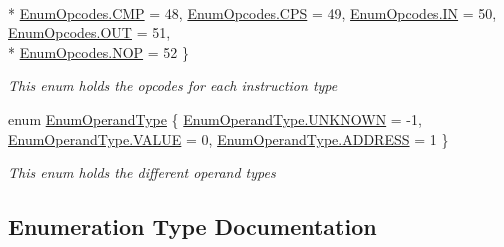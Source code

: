 \begin{DoxyCompactItemize}
\\*
\hyperlink{namespace_c_p_u___o_s___simulator_1_1_c_p_u_ac29c87bff87ad404c953b2581024043ea5cbc764daeacd3be7f410f42511c1edb}{Enum\+Opcodes.\+C\+M\+P} = 48, 
\hyperlink{namespace_c_p_u___o_s___simulator_1_1_c_p_u_ac29c87bff87ad404c953b2581024043eaad26b36ed4daec9b20ee600e0876f367}{Enum\+Opcodes.\+C\+P\+S} = 49, 
\hyperlink{namespace_c_p_u___o_s___simulator_1_1_c_p_u_ac29c87bff87ad404c953b2581024043eac86ee0d9d7ed3e7b4fdbf486fa6c0ebb}{Enum\+Opcodes.\+I\+N} = 50, 
\hyperlink{namespace_c_p_u___o_s___simulator_1_1_c_p_u_ac29c87bff87ad404c953b2581024043eaef373774188a51f80463f37b6bd9e83a}{Enum\+Opcodes.\+O\+U\+T} = 51, 
\\*
\hyperlink{namespace_c_p_u___o_s___simulator_1_1_c_p_u_ac29c87bff87ad404c953b2581024043ea1a004f5abe2b334db21328be1ea6b593}{Enum\+Opcodes.\+N\+O\+P} = 52
 \}\begin{DoxyCompactList}\small\item\em This enum holds the opcodes for each instruction type \end{DoxyCompactList}
\item 
enum \hyperlink{namespace_c_p_u___o_s___simulator_1_1_c_p_u_ad49cfe442b74115a326c03b7ae848f76}{Enum\+Operand\+Type} \{ \hyperlink{namespace_c_p_u___o_s___simulator_1_1_c_p_u_ad49cfe442b74115a326c03b7ae848f76a696b031073e74bf2cb98e5ef201d4aa3}{Enum\+Operand\+Type.\+U\+N\+K\+N\+O\+W\+N} = -\/1, 
\hyperlink{namespace_c_p_u___o_s___simulator_1_1_c_p_u_ad49cfe442b74115a326c03b7ae848f76aecc2e9c313faddb07e7da223c1dc5c3f}{Enum\+Operand\+Type.\+V\+A\+L\+U\+E} = 0, 
\hyperlink{namespace_c_p_u___o_s___simulator_1_1_c_p_u_ad49cfe442b74115a326c03b7ae848f76a2664f03ac6b8bb9eee4287720e407db3}{Enum\+Operand\+Type.\+A\+D\+D\+R\+E\+S\+S} = 1
 \}\begin{DoxyCompactList}\small\item\em This enum holds the different operand types \end{DoxyCompactList}
\end{DoxyCompactItemize}


\subsection{Enumeration Type Documentation}
\hypertarget{namespace_c_p_u___o_s___simulator_1_1_c_p_u_ab76721f84dabbc14c907e6f11fbeb7c0}{}
